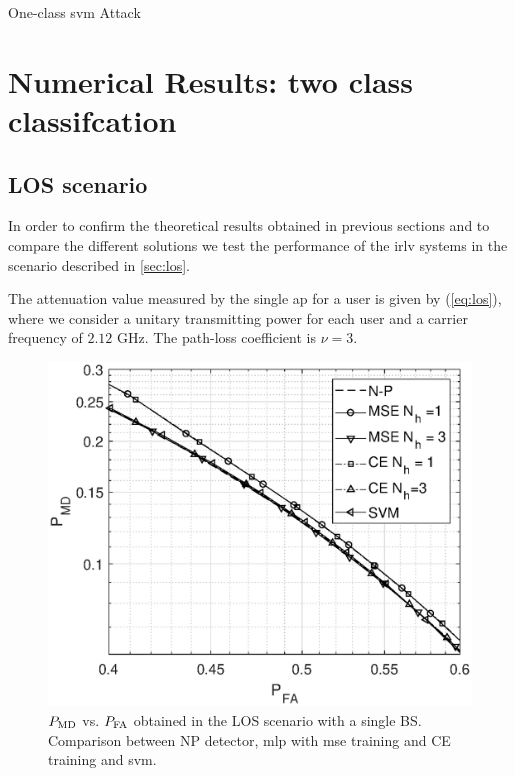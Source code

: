 \documentclass[draftcls,onecolumn,12pt]{IEEEtran}
\begin{document}
\begin{algorithm}[t]
\label{alg:svm}
  \scriptsize

 

    
 \caption{One-class \ac{svm} Attack}
\end{algorithm}


\section{Numerical Results: two class classifcation}

\subsection{LOS scenario}\label{sec:res_los}
In order to confirm the theoretical results obtained in previous sections and to compare the different solutions we test the performance of the \ac{irlv} systems in the scenario described in \ref{sec:los}.

The attenuation value measured by the single \ac{ap} for a user is given by (\ref{eq:los}), where we consider a unitary transmitting power for each user and a carrier frequency of $2.12$ GHz. The path-loss coefficient is $\nu=3$. 
\begin{figure}[h]
    \centering
    \includegraphics[width=0.5\columnwidth]{res_com_CE_MSE_SVM.eps}
    \caption{$P_{\rm MD}$ vs. $P_{\rm FA}$ obtained in the LOS scenario with a single BS. Comparison between NP detector, \ac{mlp} with \ac{mse} training and CE training and \ac{svm}.}
    \label{fig:ceVSmse}
\end{figure}
\end{document}

